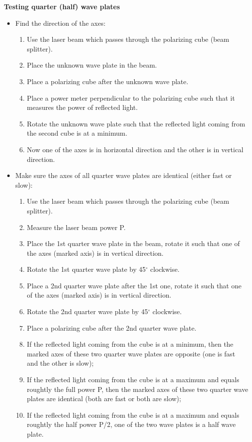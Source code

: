 \medskip
\noindent
{\bf{Testing quarter (half) wave plates}}

\begin{itemize}
\item Find the direction of the axes:

\begin{enumerate}
\item Use the laser beam which passes through the polarizing cube (beam splitter).
\item Place the unknown wave plate in the beam.
\item Place a polarizing cube after the unknown wave plate.
\item Place a power meter perpendicular to the polarizing cube such that it
      measures the power of reflected light. 
\item Rotate the unknown wave plate such that the reflected light coming
  from the second cube is at a minimum.
\item Now one of the axes is in horizontal direction and the other is in
      vertical direction.
\end{enumerate}

\item Make sure the axes of all quarter wave plates are identical (either fast or slow):

\begin{enumerate}
\item Use the laser beam which passes through the polarizing cube (beam splitter).
\item Measure the laser beam power P.
\item Place the 1st quarter wave plate in the beam, rotate it such that one of the 
      axes (marked axis) is in vertical direction.
\item Rotate the 1st quarter wave plate by 45$^\circ$ clockwise.
\item Place a 2nd quarter wave plate after the 1st one, rotate it such that one of the 
      axes (marked axis) is in vertical direction.
\item Rotate the 2nd quarter wave plate by 45$^\circ$ clockwise.
\item Place a polarizing cube after the 2nd quarter wave plate.
\item If the reflected light coming from the cube is at a minimum, then the marked 
      axes of these two quarter wave plates are opposite (one is fast and the other 
      is slow);  
\item If the reflected light coming from the cube is at a maximum and equals roughtly 
      the full power P, then the marked 
      axes of these two quarter wave plates are identical (both are fast or both are 
      slow);  
\item If the reflected light coming from the cube is at a maximum and equals roughtly 
      the half power P/2, one of the two wave plates is a half wave plate.
\end{enumerate}
\end{itemize}

